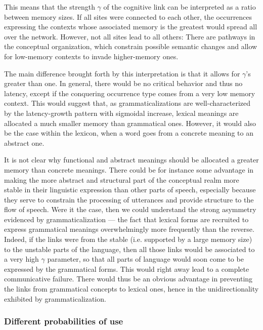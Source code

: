 \documentclass[12pt,twocolumn,amsmath,amssymb,aps,longbibliography]{revtex4-1}  %
\begin{document}
This means that the strength $\gamma$ of the cognitive link can be interpreted as a ratio between memory sizes. If all sites were connected to each other, the occurrences expressing the contexts whose associated memory is the greatest would spread all over the network. However, not all sites lead to all others: There are pathways in the conceptual organization, which constrain possible semantic changes and allow for low-memory contexts to invade higher-memory ones. 

The main difference brought forth by this interpretation is that it allows for $\gamma$'s greater than one. In general, there would be no critical behavior and thus no latency, except if the conquering occurrence type comes from a very low memory context. This would suggest that, as grammaticalizations are well-characterized by the latency-growth pattern with sigmoidal increase, lexical meanings are allocated a much smaller memory than grammatical ones. However, it would also be the case within the lexicon, when a word goes from a concrete meaning to an abstract one. 

It is not clear why functional and abstract meanings should be allocated a greater memory than concrete meanings. There could be for instance some advantage in making the more abstract and structural part of the conceptual realm more stable in their linguistic expression than  other parts of speech, especially because they serve to constrain the processing of utterances and provide structure to the flow of speech. Were it the case, then we could understand the strong asymmetry evidenced by grammaticalization --- the fact that lexical forms are recruited to express grammatical meanings overwhelmingly more frequently than the reverse. Indeed, if the links were from the stable (i.e. supported by a large memory size) to the unstable parts of the language, then all those links would be associated to a very high $\gamma$ parameter, so that all parts of language would soon come to be expressed by the grammatical forms. This would right away lead to a complete communicative failure. There would thus be an obvious advantage in preventing the links from grammatical concepts to lexical ones, hence in the unidirectionality exhibited by grammaticalization. 

\subsubsection{Different probabilities of use}
\end{document}
